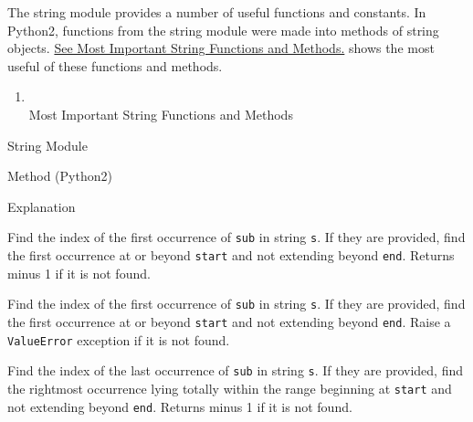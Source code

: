 The string module provides a
number of useful functions and constants. In Python2, functions from the
string module were made into methods of string objects.
\href{chap2.html\#33427}{See Most Important String Functions and
Methods.} shows the most useful of these functions and methods.

\begin{enumerate}

\item
  \\
  Most Important String Functions and Methods
\end{enumerate}

String Module

Method (Python2)

Explanation













Find the index of the first
occurrence of \texttt{sub} in string \texttt{s}. If they are provided, find
the first occurrence at or beyond \texttt{start} and not extending beyond
\texttt{end}. Returns minus 1 if it is not found.













Find the index of the first
occurrence of \texttt{sub} in string \texttt{s}. If they are provided, find
the first occurrence at or beyond \texttt{start} and not extending beyond
\texttt{end}. Raise a \texttt{ValueError} exception if it is not found.













Find the index of the last
occurrence of \texttt{sub} in string \texttt{s}. If they are provided, find
the rightmost occurrence lying totally within the range beginning at
\texttt{start} and not extending beyond \texttt{end}. Returns minus 1 if it
is not found.













